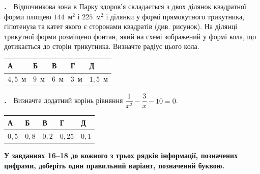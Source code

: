 \documentclass[12pt]{article}
\newcommand{\answerTable}[5]{%
\par\vspace{0.15cm}
\noindent
\begin{tabular}{|*{5}{>{\centering\arraybackslash}m{3cm}|}}
\hline
\rule[-0.15cm]{0pt}{0.6cm}\textbf{А} & \rule[-0.15cm]{0pt}{0.6cm}\textbf{Б} & \rule[-0.15cm]{0pt}{0.6cm}\textbf{В} & \rule[-0.15cm]{0pt}{0.6cm}\textbf{Г} & \rule[-0.15cm]{0pt}{0.6cm}\textbf{Д} \\
\hline
\rule[-0.2cm]{0pt}{0.75cm}#1 & \rule[-0.2cm]{0pt}{0.75cm}#2 & \rule[-0.2cm]{0pt}{0.75cm}#3 & \rule[-0.2cm]{0pt}{0.75cm}#4 & \rule[-0.2cm]{0pt}{0.75cm}#5 \\
\hline
\end{tabular}
\par\vspace{0.25cm}
}
\newcommand{\instructionBox}[1]{%
\par\vspace{0.3cm}
\begin{tcolorbox}[colback=instrBg, colframe=instrBorder, boxrule=0.6pt, arc=2pt,
    left=8pt, right=8pt, top=4pt, bottom=4pt]
\centering\small\bfseries #1
\end{tcolorbox}
\par\vspace{0.15cm}
}
\newcounter{zad}
\newcommand{\zadtask}[1]{\stepcounter{zad}\par\vspace{0.3cm}\noindent\textbf{\thezad.}\ \ #1\par\vspace{0.2cm}}
\newcommand{\zadnum}{\stepcounter{zad}\noindent\textbf{\thezad.}\ \ }
\begin{document}
\noindent
\begin{minipage}[c]{0.54\textwidth}
\zadnum Відпочинкова зона в Парку здоров'я складається з двох ділянок квадратної форми площею $144$~м$^2$ і $225$~м$^2$ і ділянки у формі прямокутного трикутника, гіпотенуза та катет якого є сторонами квадратів (див. рисунок). На ділянці трикутної форми розміщено фонтан, який на схемі зображений у формі кола, що дотикається до сторін трикутника. Визначте радіус цього кола.
\end{minipage}%
\hfill
\begin{minipage}[c]{0.44\textwidth}
\centering
\begin{center}
\end{center}
\end{minipage}
\par\vspace{0.2cm}
\answerTable{$4{,}5$~м}{$9$~м}{$6$~м}{$3$~м}{$1{,}5$~м}

\zadtask{Визначте додатний корінь рівняння $\dfrac{1}{x^2} - \dfrac{3}{x} - 10 = 0$.}
\answerTable{$0{,}5$}{$0{,}8$}{$0{,}2$}{$0{,}25$}{$0{,}1$}
\newpage
\instructionBox{У завданнях 16--18 до кожного з трьох рядків інформації, позначених цифрами, доберіть один правильний варіант, позначений буквою.}
\end{document}
